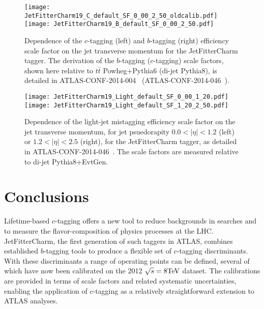 \newcommand{\lSF}{as detailed in ATLAS-CONF-2014-046~\cite{bc2014}. The scale factors are measured relative to di-jet Pythia8+EvtGen.} %
\newcommand{\cSF}{as detailed in ATLAS-CONF-2014-046~\cite{bc2014}. The scale factors are measured relative to di-jet Pythia8.} %
\newcommand{\bSF}{as detailed in ATLAS-CONF-2014-004~\cite{Giacinto}. The scale factors are measured relative to $t \bar{t}$ Powheg+Pythia6.} %

\begin{figure}[!h]
  \centering
  \texttt{[image: JetFitterCharm19\_C\_default\_SF\_0\_00\_2\_50\_oldcalib.pdf]}
  \texttt{[image: JetFitterCharm19\_B\_default\_SF\_0\_00\_2\_50.pdf]}
  \caption{Dependence of the $c$-tagging (left) and $b$-tagging (right) efficiency scale factor on the jet transverse momentum for the JetFitterCharm tagger. The derivation of the $b$-tagging ($c$-tagging) scale factors, shown here relative to $t \bar{t}$ Powheg+Pythia6 (di-jet Pythia8), is detailed in ATLAS-CONF-2014-004~\cite{Giacinto} (ATLAS-CONF-2014-046~\cite{bc2014}).}
  \label{tag:JFC_SF_B}
\end{figure}

\begin{figure}[!htb]
  \centering
  \texttt{[image: JetFitterCharm19\_Light\_default\_SF\_0\_00\_1\_20.pdf]}
  \texttt{[image: JetFitterCharm19\_Light\_default\_SF\_1\_20\_2\_50.pdf]}
  \caption{Dependence of the light-jet mistagging efficiency scale factor on the jet transverse momentum, for jet psuedorapity $0.0 < | \eta | < 1.2$ (left) or $1.2 < | \eta | < 2.5$ (right), for the JetFitterCharm tagger, \lSF}
  
  \label{tag:JFC_SF_L1}
\end{figure}


\section{Conclusions}
\label{tag:sec:concl}

Lifetime-based $c$-tagging offers a new tool to reduce backgrounds in searches and to measure the flavor-composition of physics processes at the LHC. JetFitterCharm, the first generation of such taggers in ATLAS, combines established $b$-tagging tools to produce a flexible set of $c$-tagging discriminants. With these discriminants a range of operating points can be defined, several of which have now been calibrated on the 2012 $\sqrt{s} = 8 \text{TeV}$ dataset. The calibrations are provided in terms of scale factors and related systematic uncertainties, enabling the application of $c$-tagging as a relatively straightforward extension to ATLAS analyses.

